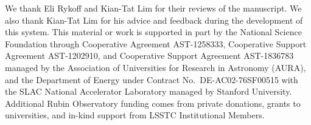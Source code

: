 \documentclass[]{spie}
\begin{document}
\acknowledgments

We thank Eli Rykoff and Kian-Tat Lim for their reviews of the manuscript.
We also thank Kian-Tat Lim for his advice and feedback during the development of this system.
This material or work is supported in part by the National Science Foundation through Cooperative Agreement AST-1258333, Cooperative Support Agreement AST-1202910, and Cooperative Support Agreement AST-1836783 managed by the Association of Universities for Research in Astronomy (AURA), and the Department of Energy under Contract No.\ DE-AC02-76SF00515 with the SLAC National Accelerator Laboratory managed by Stanford University.
Additional Rubin Observatory funding comes from private donations, grants to universities, and in-kind support from LSSTC Institutional Members.

\begin{thebibliography}{10}


\end{thebibliography}
\end{document}
